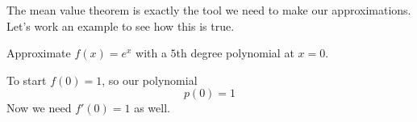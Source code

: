 \documentclass{ximera}
\begin{document}
The mean value theorem is exactly the tool we need to make our
approximations. Let's work an example to see how this is true.

\begin{example}
  Approximate $f(x) = e^x$ with a $5$th degree polynomial at $x = 0$.
  \begin{explanation}
    To start $f(0) = 1$, so our polynomial
    \[
    p(0) = 1
    \]
    Now we need $f'(0) = 1$ as well. 
  \end{explanation}
\end{example}
\end{document}
